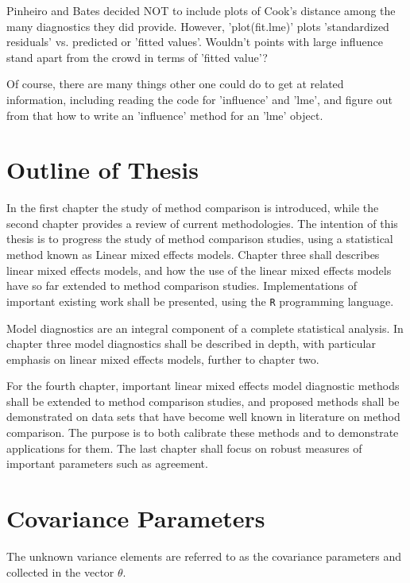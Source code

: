 \documentclass[12pt, a4paper]{report}
\theoremstyle{plain}
\theoremstyle{definition}
\theoremstyle{remark}
\begin{document}
Pinheiro and Bates decided NOT to include plots of Cook's distance among the many diagnostics they did provide.  
However, 'plot(fit.lme)' plots 'standardized residuals' vs. predicted or 'fitted values'.  
Wouldn't points with large influence stand apart from the crowd in terms of 'fitted value'?

Of course, there are many things other one could do to get at related information, including reading the code for 'influence' and 'lme', and 
figure out from that how to write an 'influence' method for an 'lme' object. 








\section{Outline of Thesis}
In the first chapter the study of method comparison is introduced, while the second chapter provides a review of current methodologies. The intention of this thesis is to progress the
study of method comparison studies, using a statistical method known as Linear mixed effects models.
Chapter three shall describes linear mixed effects models, and how the use of the linear mixed
effects models have so far extended to method comparison studies. Implementations of important existing work shall be presented, using the \texttt{R} programming language.

Model diagnostics are an integral component of a complete statistical analysis.
In chapter three model diagnostics shall be described in depth, with particular
emphasis on linear mixed effects models, further to chapter two.

For the fourth chapter, important linear mixed effects model diagnostic methods shall be extended to method comparison studies, and proposed methods shall be demonstrated on data sets that have become well known in literature on method comparison. The purpose is to both calibrate these methods and to demonstrate applications for them.
The last chapter shall focus on robust measures of important parameters such as agreement.




\section{Covariance Parameters} %
The unknown variance elements are referred to as the covariance parameters and collected in the vector $\theta$.
\end{document}
